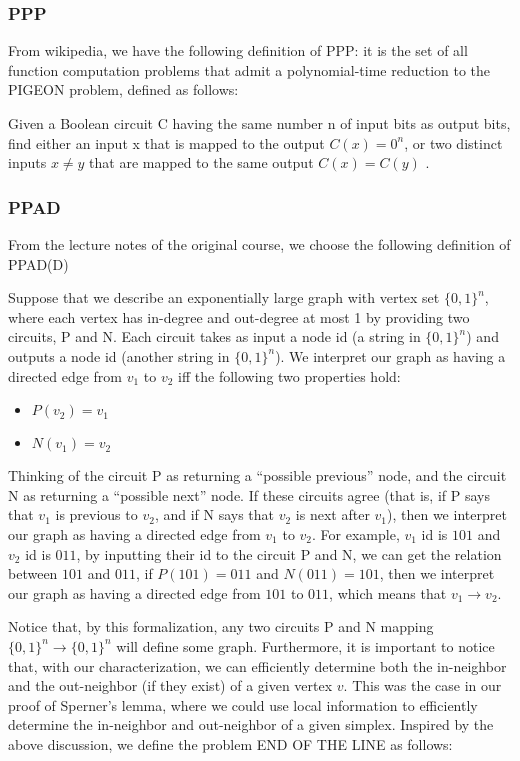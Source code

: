 \documentclass{article}
\begin{document}
\subsubsection{PPP}

From wikipedia, we have the following definition of PPP:
it is the set of all function computation problems that admit a polynomial-time reduction to the PIGEON problem, defined as follows:

Given a Boolean circuit C having the same number n of input bits as output bits, find either an input x that is mapped to the output $C(x) = 0^n$, or two distinct inputs $x \neq y$ that are mapped to the same output $C(x) = C(y)$ \cite{wiki:PPP_(complexity)} . 

\subsubsection{PPAD}

From the lecture notes \cite{lecture_notes:lec8} of the original course, we choose the following definition of PPAD(D)

Suppose that we describe an exponentially large graph with vertex set $\{0, 1\}^
n$, where each vertex has
in-degree and out-degree at most 1 by providing two circuits, P and N. Each circuit takes as input a
node id (a string in $\{0, 1\}^
n$) and outputs a node id (another string in $\{0, 1\}^
n$). We interpret our graph
as having a directed edge from $v_1$ to $v_2$ iff the following two properties hold:

\begin{itemize}
    \item $P(v_2) = v_1$
    \item $N(v_1) = v_2$
\end{itemize}


Thinking of the circuit P as returning a “possible previous” node, and the circuit N as returning a “possible next” node. 
If these circuits agree (that is, if P says that $v_1$ is previous to $v_2$, and if N says that $v_2$ is next after $v_1$), then we interpret our graph as having a directed edge from $v_1$ to $v_2$. 
For example, $v_1$ id is $101$ and $v_2$ id is $011$, by inputting their id to the circuit P and N, we can get the relation between $101$ and $011$, if $P(101) = 011$ and $N(011) = 101$, then we interpret our graph as having a directed edge from $101$ to $011$, which means that $v_1 \rightarrow v_2$. 

Notice that, by this formalization, any two circuits P and N mapping $\{0, 1\}^n \rightarrow \{0, 1\}^n$ will define some graph. 
Furthermore, it is important to notice that, with our characterization, we can efficiently determine both the in-neighbor and the out-neighbor (if they exist) of a given vertex $v$. 
This was the case in our proof of Sperner's lemma, where we could use local information to efficiently determine the in-neighbor and out-neighbor of a given simplex.
Inspired by the above discussion, we define the problem END OF THE LINE as follows:
\end{document}
